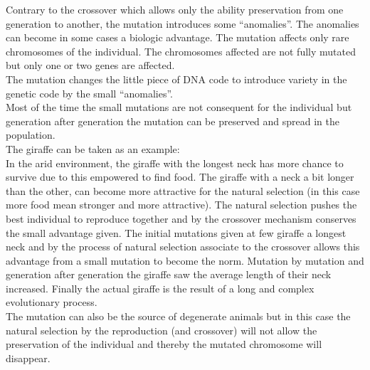 Contrary to the crossover which allows only the ability preservation from one generation to another, the mutation introduces some “anomalies”. The anomalies can become in some cases a biologic advantage.
The mutation affects only rare chromosomes of the individual. The chromosomes affected are not fully mutated but only one or two genes are affected. \\
The mutation changes the little piece of DNA code to introduce variety in the genetic code by the small “anomalies”.\\
Most of the time the small mutations are not consequent for the individual but generation after generation the mutation can be preserved and spread in the population. \\  



The giraffe can be taken as an example:\\
 In the arid environment, the giraffe with the longest neck has more chance to survive due to this empowered to find food. The giraffe with a neck a bit longer than the other, can become more attractive for the natural selection (in this case more food mean stronger and more attractive). The natural selection pushes the best individual to reproduce together and by the crossover mechanism conserves the small advantage given. The initial mutations given at few giraffe a longest neck and by the process of natural selection associate to the crossover allows this advantage from a small mutation to become the norm. Mutation by mutation and generation after generation the giraffe  saw the average length of their neck increased. Finally the actual giraffe is the result of a long and complex evolutionary process. \\ 
The mutation can also be the source of degenerate animals but in this case the natural selection  by the reproduction (and crossover) will not allow the preservation of the individual and thereby the mutated chromosome will disappear.\\ 

